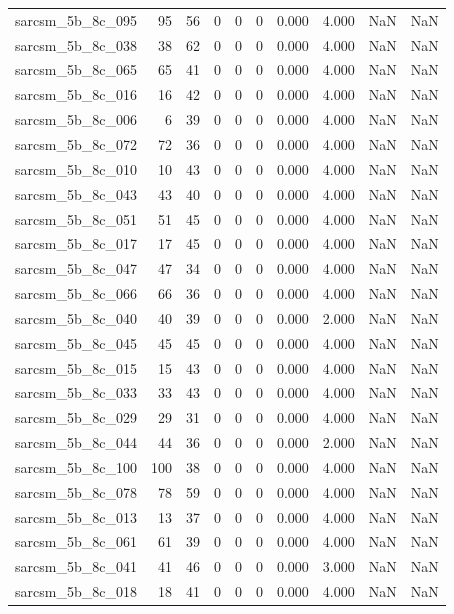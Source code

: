 \documentclass{article}
\begin{document}
\begin{longtable}{lrrrrrrrrr}
sarcsm\_5b\_8c\_095 & 95 & 56 & 0 & 0 & 0 & 0.000 & 4.000 & NaN & NaN \\
sarcsm\_5b\_8c\_038 & 38 & 62 & 0 & 0 & 0 & 0.000 & 4.000 & NaN & NaN \\
sarcsm\_5b\_8c\_065 & 65 & 41 & 0 & 0 & 0 & 0.000 & 4.000 & NaN & NaN \\
sarcsm\_5b\_8c\_016 & 16 & 42 & 0 & 0 & 0 & 0.000 & 4.000 & NaN & NaN \\
sarcsm\_5b\_8c\_006 & 6 & 39 & 0 & 0 & 0 & 0.000 & 4.000 & NaN & NaN \\
sarcsm\_5b\_8c\_072 & 72 & 36 & 0 & 0 & 0 & 0.000 & 4.000 & NaN & NaN \\
sarcsm\_5b\_8c\_010 & 10 & 43 & 0 & 0 & 0 & 0.000 & 4.000 & NaN & NaN \\
sarcsm\_5b\_8c\_043 & 43 & 40 & 0 & 0 & 0 & 0.000 & 4.000 & NaN & NaN \\
sarcsm\_5b\_8c\_051 & 51 & 45 & 0 & 0 & 0 & 0.000 & 4.000 & NaN & NaN \\
sarcsm\_5b\_8c\_017 & 17 & 45 & 0 & 0 & 0 & 0.000 & 4.000 & NaN & NaN \\
sarcsm\_5b\_8c\_047 & 47 & 34 & 0 & 0 & 0 & 0.000 & 4.000 & NaN & NaN \\
sarcsm\_5b\_8c\_066 & 66 & 36 & 0 & 0 & 0 & 0.000 & 4.000 & NaN & NaN \\
sarcsm\_5b\_8c\_040 & 40 & 39 & 0 & 0 & 0 & 0.000 & 2.000 & NaN & NaN \\
sarcsm\_5b\_8c\_045 & 45 & 45 & 0 & 0 & 0 & 0.000 & 4.000 & NaN & NaN \\
sarcsm\_5b\_8c\_015 & 15 & 43 & 0 & 0 & 0 & 0.000 & 4.000 & NaN & NaN \\
sarcsm\_5b\_8c\_033 & 33 & 43 & 0 & 0 & 0 & 0.000 & 4.000 & NaN & NaN \\
sarcsm\_5b\_8c\_029 & 29 & 31 & 0 & 0 & 0 & 0.000 & 4.000 & NaN & NaN \\
sarcsm\_5b\_8c\_044 & 44 & 36 & 0 & 0 & 0 & 0.000 & 2.000 & NaN & NaN \\
sarcsm\_5b\_8c\_100 & 100 & 38 & 0 & 0 & 0 & 0.000 & 4.000 & NaN & NaN \\
sarcsm\_5b\_8c\_078 & 78 & 59 & 0 & 0 & 0 & 0.000 & 4.000 & NaN & NaN \\
sarcsm\_5b\_8c\_013 & 13 & 37 & 0 & 0 & 0 & 0.000 & 4.000 & NaN & NaN \\
sarcsm\_5b\_8c\_061 & 61 & 39 & 0 & 0 & 0 & 0.000 & 4.000 & NaN & NaN \\
sarcsm\_5b\_8c\_041 & 41 & 46 & 0 & 0 & 0 & 0.000 & 3.000 & NaN & NaN \\
sarcsm\_5b\_8c\_018 & 18 & 41 & 0 & 0 & 0 & 0.000 & 4.000 & NaN & NaN \\

\end{longtable}
\end{document}
